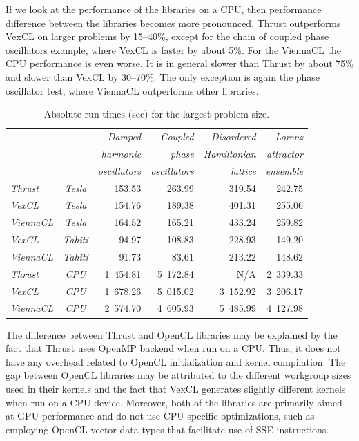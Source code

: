 \documentclass[1p]{elsarticle}
\begin{document}
If we look at the performance of the libraries on a CPU, then performance
difference between the libraries becomes more pronounced. Thrust outperforms
VexCL on larger problems by 15--40\%, except for the chain of coupled phase
oscillators example, where VexCL is faster by about 5\%. For the ViennaCL the
CPU performance is even worse. It is in general slower than Thrust by about
75\%  and slower than VexCL by 30--70\%. The only exception is again the phase
oscillator test, where ViennaCL outperforms other libraries.

\begin{table}
    \begin{center}
    \begin{tabular}{|lc|rrrr|}
	\hline
	& & \em Damped	    & \em Coupled	& \em Disordered    & \em Lorenz    \\
	& & \em harmonic    & \em phase		& \em Hamiltonian   & \em attractor \\
	& & \em oscillators & \em oscillators	& \em lattice	    & \em ensemble  \\
	\hline
	\em Thrust   &\em Tesla & 153.53 & 263.99 & 319.54 & 242.75 \\
	\em VexCL    &\em Tesla & 154.76 & 189.38 & 401.31 & 255.06 \\
	\em ViennaCL &\em Tesla & 164.52 & 165.21 & 433.24 & 259.82 \\
	\hline
	\em VexCL    &\em Tahiti &  94.97 & 108.83 & 228.93 & 149.20 \\
	\em ViennaCL &\em Tahiti &  91.73 &  83.61 & 213.22 & 148.62 \\
	\hline
	\em Thrust   &\em CPU	& 1~454.81 & 5~172.84 &      N/A & 2~339.33 \\
	\em VexCL    &\em CPU	& 1~678.26 & 5~015.02 & 3~152.92 & 3~206.17 \\
	\em ViennaCL &\em CPU	& 2~574.70 & 4~605.93 & 5~485.99 & 4~127.98 \\
	\hline
    \end{tabular}
    \caption{Absolute run times (sec) for the largest problem size.}
    \label{tab:abstimes}
    \end{center}
\end{table}


The difference between Thrust and OpenCL libraries may be explained by the fact
that Thrust uses OpenMP backend when run on a CPU. Thus, it does not have any
overhead related to OpenCL initialization and kernel compilation.  The gap
between OpenCL libraries may be attributed to the different workgroup sizes
used in their kernels and the fact that VexCL generates slightly different
kernels when run on a CPU device. Moreover, both of the libraries are primarily
aimed at GPU performance and do not use CPU-specific optimizations, such as
employing OpenCL vector data types that facilitate use of SSE instructions.
\end{document}
